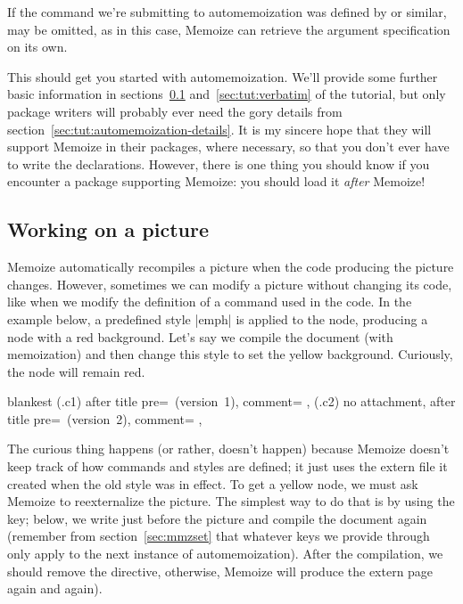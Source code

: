 \documentclass[a4paper,11pt]{article}
\begin{document}
If the command we're submitting to automemoization was defined by
 or similar,  may be omitted, as in
this case, Memoize can retrieve the argument specification on its own.

This should get you started with automemoization.  We'll provide some further
basic information in sections~\ref{sec:tut:working-on-a-picture}
and~\ref{sec:tut:verbatim} of the tutorial, but only package writers will
probably ever need the gory details from
section~\ref{sec:tut:automemoization-details}.  It is my sincere hope that they
will support Memoize in their packages, where necessary, so that you don't ever
have to write the  declarations.  However, there is one thing you
should know if you encounter a package supporting Memoize: you should load it
\emph{after} Memoize!



\subsection{Working on a picture}
\label{sec:tut:working-on-a-picture}


Memoize automatically recompiles a picture when the code producing the picture
changes.  However, sometimes we can modify a picture without changing its code,
like when we modify the definition of a command used in the code.  In the
example below, a predefined style |emph| is applied to the node, producing a
node with a red background.  Let's say we compile the document (with
memoization) and then change this style to set the yellow background.
Curiously, the node will remain red.

\begin{tcboxedraster}[raster columns=2, raster valign=top, raster column skip=4mm]{blankest}
  (.c1){
    after title pre={\ (version~1)},
    comment={\centering
    },
  }
  (.c2){
    no attachment,
    after title pre={\ (version~2)},
    comment={\centering
    },
  }
\end{tcboxedraster}

The curious thing happens (or rather, doesn't happen) because Memoize doesn't
keep track of how commands and styles are defined; it just uses the extern file
it created when the old style was in effect.  To get a yellow node, we must ask
Memoize to reexternalize the picture.  The simplest way to do that is by using
the  key; below, we write
 just before the picture and
compile the document again (remember from section~\ref{sec:mmzset} that
whatever keys we provide through  only apply to the next instance of
automemoization).  After the compilation, we should remove the
 directive, otherwise, Memoize will produce the extern page
again and again).
\end{document}
